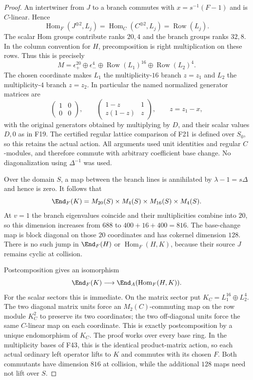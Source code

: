 \documentclass[11pt,a4paper]{article}
\newcommand{\fid}[1]{\textsf{#1}}\newcommand{\gate}[1]{\textsf{#1}}
\theoremstyle{named}\newtheorem{finding}{Finding}[section]
\theoremstyle{definition}\newtheorem{definition}[finding]{Definition}
\theoremstyle{remark}\newtheorem{remark}[finding]{Remark}
\begin{document}
\begin{proof}
An intertwiner from $J$ to a branch commutes with
$x=s^{-1}(F-1)$ and is $C$-linear. Hence
\[
 \operatorname{Hom}_F(J^{\oplus2},L_j)
    =\operatorname{Hom}_C(C^{\oplus2},L_j)
    =\operatorname{Row}(L_j).
\]
The scalar Hom groups contribute ranks $20,4$ and the branch
groups ranks $32,8$. In the column convention for $H$,
precomposition is right multiplication on these rows.
Thus this is precisely
\[
 M=\epsilon_+^{20}\oplus\epsilon_-^4
       \oplus\operatorname{Row}(L_1)^{16}
       \oplus\operatorname{Row}(L_2)^4.
\]
The chosen coordinate makes $L_1$ the multiplicity-$16$
branch $z=z_1$ and $L_2$ the multiplicity-$4$ branch $z=z_2$.
In particular the named normalized generator matrices are
\[
 \begin{pmatrix}1&0\\0&0\end{pmatrix},\qquad
 \begin{pmatrix}1-z&1\\z(1-z)&z\end{pmatrix},
 \qquad z=z_1-x,
\]
with the original generators obtained by multiplying by $D$,
and their scalar values $D,0$ as in \fid{F19}.
The certified regular lattice comparison of \fid{F21}
is defined over $S_0$, so this retains the actual action.
All arguments used unit identities and regular $C$-modules,
and therefore commute with arbitrary coefficient base change.
No diagonalization using $\Delta^{-1}$ was used.

Over the domain $S$, a map between the branch lines is
annihilated by $\lambda-1=s\Delta$ and hence is zero.
It follows that
\begin{equation}\label{eq:cayleycommutant}
 \End_F(K)=M_{20}(S)\times M_4(S)\times M_{16}(S)\times M_4(S).
\end{equation}
At $v=1$ the branch eigenvalues coincide and their multiplicities
combine into $20$, so this dimension increases from $688$ to
$400+16+400=816$. The base-change map is block diagonal
on those $20$ coordinates and has cokernel dimension $128$.
There is no such jump in $\End_F(H)$ or $\operatorname{Hom}_F(H,K)$,
because their source $J$ remains cyclic at collision.

Postcomposition gives an isomorphism
\[
 \End_F(K)\longrightarrow\End_A(\operatorname{Hom}_F(H,K)).
\]
For the scalar sectors this is immediate. On the matrix sector
put $K_C=L_1^{16}\oplus L_2^4$. The two diagonal matrix units
force an $M_2(C)$-commuting map on the row module $K_C^2$
to preserve its two coordinates; the two off-diagonal units
force the same $C$-linear map on each coordinate.
This is exactly postcomposition by a unique endomorphism of
$K_C$. The proof works over every base ring.
In the multiplicity bases of \fid{F43}, this is the identical
product-matrix action, so each actual ordinary left operator
lifts to $K$ and commutes with its chosen $F$.
Both commutants have dimension $816$ at collision, while
the additional $128$ maps need not lift over $S$.


\end{proof}
\end{document}
